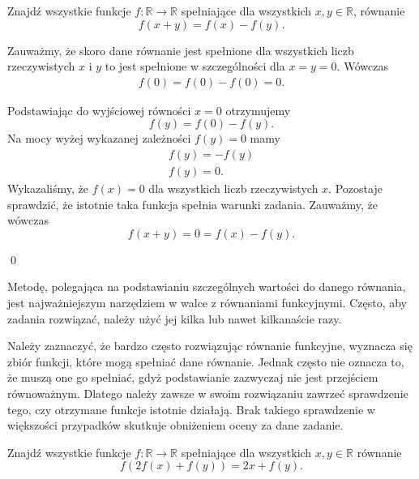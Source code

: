 


\noindent
Znajdź wszystkie funkcje $f:\mathbb{R}\rightarrow\mathbb{R}$ spełniające dla wszystkich $x, y \in \mathbb{R}$, równanie 
\[
    f(x + y) = f(x) − f(y).
\]


\noindent
Zauważmy, że skoro dane równanie jest spełnione dla wszystkich liczb rzeczywistych $x$ i $y$ to jest spełnione w szczególności dla $x = y = 0$. Wówczas
\begin{gather*}
    f(0) = f(0) - f(0) = 0.
\end{gather*}

\noindent
Podstawiając do wyjściowej równości $x = 0$ otrzymujemy
\[
    f(y) = f(0) - f(y).
\]
Na mocy wyżej wykazanej zależności $f(y) = 0$ mamy
\begin{gather*}
    f(y) = - f(y) \\
    f(y) = 0.
\end{gather*}
Wykazaliśmy, że $f(x) = 0$ dla wszystkich liczb rzeczywistych $x$. Pozostaje sprawdzić, że istotnie taka funkcja spełnia warunki zadania. Zauważmy, że wówczas
\[
    f(x + y) = 0 = f(x) - f(y).
\]

\qed

\vspace{10px}

\noindent
Metodę, polegająca na podstawianiu szczególnych wartości do danego równania, jest najważniejszym narzędziem w walce z równaniami funkcyjnymi. Często, aby zadania rozwiązać, należy użyć jej kilka lub nawet kilkanaście razy.

\vspace{10px}

\noindent
Należy zaznaczyć, że bardzo często rozwiązując równanie funkcyjne, wyznacza się zbiór funkcji, które mogą spełniać dane równanie. Jednak często nie oznacza to, że muszą one go spełniać, gdyż podstawianie zazwyczaj nie jest przejściem równoważnym. Dlatego należy zawsze w swoim rozwiązaniu zawrzeć sprawdzenie tego, czy otrzymane funkcje istotnie działają. Brak takiego sprawdzenie w większości przypadków skutkuje obniżeniem oceny za dane zadanie.

\vspace{20px}


\noindent
Znajdź wszystkie funkcje $f:\mathbb{R}\rightarrow\mathbb{R}$ spełniające dla wszystkich $x, y \in \mathbb{R}$ równanie 
\[
    f(2f(x) + f(y)) = 2x + f(y).
\]

